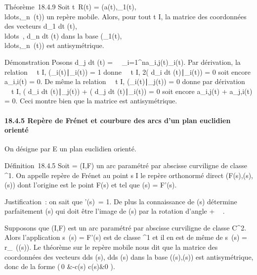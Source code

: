 \documentclass[]{article}
\begin{document}
Théorème~18.4.9 Soit t\mapsto~R(t) =
(a(t),\overrightarrowe_1(t),\\ldots,\overrightarrowe_n~(t))
un repère mobile. Alors, pour tout t \in I, la matrice des coordonnées des
vecteurs  d\overrightarrowe_1
\over dt
(t),\\ldots~,
d\overrightarrowe_n \over
dt (t) dans la base
(\overrightarrowe_1(t),\\ldots,\overrightarrowe_n~(t))
est antisymétrique.

Démonstration Posons  d\overrightarrowe_j
\over dt (t) =\
\sum ~
_i=1^na_i,j(t)\overrightarrowe_i(t).
Par dérivation, la relation \forall~~t \in I,
(\overrightarrowe_i(t)∣\overrightarrowe_i(t))
= 1 donne \forall~~t \in I, 2(
d\overrightarrowe_i \over
dt
(t)∣\overrightarrowe_i(t))
= 0 soit encore a_i,i(t) = 0. De même la relation
\forall~~t \in I,
(\overrightarrowe_i(t)∣\overrightarrowe_j(t))
= 0 donne par dérivation \forall~~t \in I, (
d\overrightarrowe_i \over
dt
(t)∣\overrightarrowe_j(t))
+ ( d\overrightarrowe_j
\over dt
(t)∣\overrightarrowe_i(t))
= 0 soit encore a_i,j(t) + a_j,i(t) = 0. Ceci montre
bien que la matrice est antisymétrique.

\paragraph{18.4.5 Repère de Frénet et courbure des arcs d'un plan
euclidien orienté}

On désigne par E un plan euclidien orienté.

Définition~18.4.5 Soit \Gamma = (I,F) un arc paramétré par abscisse
curviligne de classe \mathcal{C}^1. On appelle repère de Frénet au
point s \in I le repère orthonormé direct
(F(s),\vect(s),\vecn(s)) dont
l'origine est le point F(s) et tel que \vect(s) =
F'(s).

Justification~: on sait que
\F'(s)\ = 1. De plus
la connaissance de \vect(s) détermine parfaitement
\vecn(s) qui doit être l'image de
\vect(s) par la rotation d'angle + \pi~
 .

Supposons que (I,F) est un arc paramétré par abscisse curviligne de
classe C^2. Alors l'application
s\mapsto~\vect(s) = F'(s) est de
classe ^1 et il en est de même de
s\mapsto~\vecn(s) =
r_\pi~(\vect(s)). Le théorème sur le repère
mobile nous dit que la matrice des coordonnées des vecteurs 
d\vect \over ds (s),
d\vecn \over ds (s) dans la base
(\vect(s),\vecn(s)) est
antisymétrique, donc de la forme \left
(\matrix\,0 &-c(s) \cr
c(s)&0 \right ).
\end{document}
